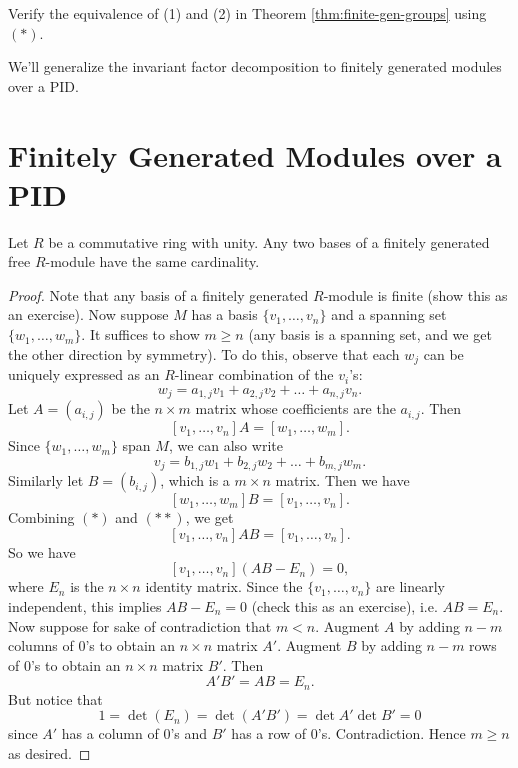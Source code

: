 \begin{exercise}
  Verify the equivalence of (1) and (2) in Theorem
  \ref{thm:finite-gen-groups} using $(*)$.
\end{exercise}

\begin{remark}
  We'll generalize the invariant factor decomposition
  to finitely generated modules over a PID.
\end{remark}

\section{Finitely Generated Modules over a PID}
\begin{lemma}
  Let $R$ be a commutative ring with unity. Any two bases
  of a finitely generated free $R$-module have the
  same cardinality.
\end{lemma}

\begin{proof}
  Note that any basis of a finitely generated $R$-module
  is finite (show this as an exercise). Now suppose $M$
  has a basis $\{v_1, \dots, v_n\}$ and a spanning set
  $\{w_1, \dots, w_m\}$. It suffices to show $m \ge n$
  (any basis is a spanning set, and we get the other
  direction by symmetry). To do this, observe that
  each $w_j$ can be uniquely expressed as an $R$-linear
  combination of the $v_i$'s:
  \[
    w_j = a_{1, j} v_1 + a_{2, j} v_2 + \dots + a_{n, j} v_n.
  \]
  Let $A = (a_{i, j})$ be the $n \times m$ matrix whose
  coefficients are the $a_{i, j}$. Then
  \[
    [v_1, \dots, v_n] A = [w_1, \dots, w_m]. \tag{$*$}
  \]
  Since $\{w_1, \dots, w_m\}$ span $M$, we can also write
  \[
    v_j = b_{1, j} w_1 + b_{2, j} w_2 + \dots + b_{m, j} w_m.
  \]
  Similarly let $B = (b_{i, j})$, which is a
  $m \times n$ matrix. Then we have
  \[
    [w_1, \dots, w_m] B = [v_1, \dots, v_n]. \tag{$**$}
  \]
  Combining $(*)$ and $(**)$, we get
  \[
    [v_1, \dots, v_n] A B = [v_1, \dots, v_n].
  \]
  So we have
  \[
    [v_1, \dots, v_n](AB - E_n) = 0,
  \]
  where $E_n$ is the $n \times n$ identity matrix. Since
  the $\{v_1, \dots, v_n\}$ are linearly independent,
  this implies $AB - E_n = 0$ (check this as an exercise),
  i.e. $AB = E_n$. Now suppose for sake of contradiction
  that $m < n$. Augment $A$ by adding $n - m$ columns
  of $0$'s to obtain an $n \times n$ matrix $A'$. Augment
  $B$ by adding $n - m$ rows of $0$'s to obtain
  an $n \times n$ matrix $B'$. Then
  \[
    A'B' = AB = E_n.
  \]
  But notice that
  \[
    1 = \det(E_n) = \det(A'B') = \det A' \det B' = 0
  \]
  since $A'$ has a column of $0$'s and $B'$ has a row
  of $0$'s. Contradiction. Hence $m \ge n$ as desired.
\end{proof}


